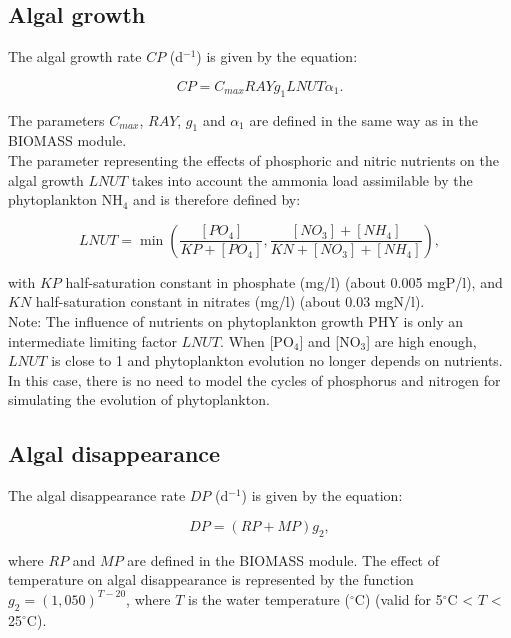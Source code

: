\subsection{Algal growth}

The algal growth rate $CP$ (d$^{-1}$) is given by the equation:

\begin{equation}
  CP = C_{max} RAY g_1 LNUT \alpha_1.
\end{equation}

The parameters $C_{max}$, $RAY$, $g_1$ and $\alpha_1$ are defined in the same way as in the BIOMASS module.\\

The parameter representing the effects of phosphoric
and nitric nutrients on the algal growth $LNUT$ takes into account
the ammonia load assimilable by the phytoplankton NH$_4$ and is therefore defined by:

\begin{equation}
  LNUT = \min \left( \frac{[PO_4]}{KP+[PO_4]}, \frac{[NO_3]+[NH_4]}{KN+[NO_3]+[NH_4]} \right),
\end{equation}

with $KP$ half-saturation constant in phosphate (mg/l) (about 0.005 mgP/l),
and $KN$ half-saturation constant in nitrates (mg/l) (about 0.03 mgN/l).\\

Note: The influence of nutrients on phytoplankton growth PHY is only an intermediate limiting factor $LNUT$.
When [PO$_4$] and [NO$_3$] are high enough, $LNUT$ is close to 1
and phytoplankton evolution no longer depends on nutrients.
In this case, there is no need to model the cycles of phosphorus and
nitrogen for simulating the evolution of phytoplankton.

\subsection{Algal disappearance}

The algal disappearance rate $DP$ (d$^{-1}$) is given by the equation:

\begin{equation}
  DP = (RP + MP) g_2,
\end{equation}

where $RP$ and $MP$ are defined in the BIOMASS module.
The effect of temperature on algal disappearance
is represented by the function $g_2 = (1,050)^{T-20}$,
where $T$ is the water temperature ($^{\circ}$C) (valid for 5$^{\circ}$C < $T$ < 25$^{\circ}$C).

